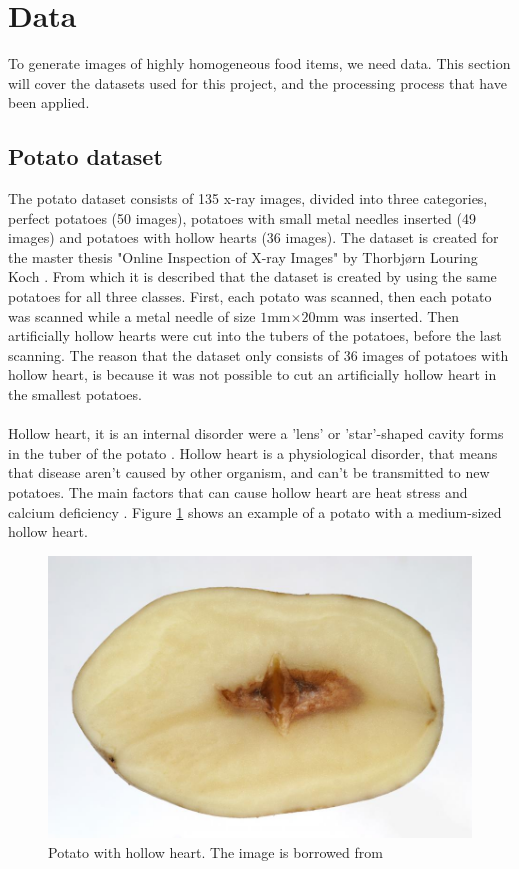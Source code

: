 \documentclass[11pt]{article}
\begin{document}
\section{Data}\label{sec:data}

To generate images of highly homogeneous food items, we need data.
This section will cover the datasets used for this project, and the processing process that have been applied.

\subsection{Potato dataset}

The potato dataset consists of 135 x-ray images, divided into three categories, perfect potatoes (50 images), potatoes with small metal needles inserted (49 images) and potatoes with hollow hearts (36 images). The dataset is created for the master thesis "Online Inspection of X-ray Images" by Thorbjørn Louring Koch \cite{Online_Inspection_of_X-ray_Images}. From which it is described that the dataset is created by using the same potatoes for all three classes. First, each potato was scanned, then each potato was scanned while a metal needle of size $1$mm$\times  20$mm was inserted. Then artificially hollow hearts were cut into the tubers of the potatoes, before the last scanning. The reason that the dataset only consists of 36 images of potatoes with hollow heart, is because it was not possible to cut an artificially hollow heart in the smallest potatoes.
\\ \\
Hollow heart, it is an internal disorder were a 'lens' or 'star'-shaped cavity forms in the tuber of the potato \cite{hollow_heart1}. Hollow heart is a physiological disorder, that means that disease aren't caused by other organism, and can't be transmitted to new potatoes. 
The main factors that can cause hollow heart are heat stress and calcium deficiency \cite{hollow_heart1}. Figure \ref{fig:data_hollow_heart} shows an example of a potato with a medium-sized hollow heart.
\begin{figure}[!h]
    \centering
    \includegraphics[scale=0.2]{figurer/potato_experiment/Hollow_heart.jpg}
    \caption{Potato with hollow heart. The image is borrowed from }
    \label{fig:data_hollow_heart}
\end{figure}
\end{document}
